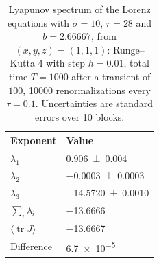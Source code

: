 \begin{table}
\centering
{}
\caption{Lyapunov spectrum of the Lorenz equations with $\sigma = 10$, $r = 28$ and $b = 2.66667$, from $(x, y, z) = (1, 1, 1)$: Runge--Kutta 4 with step $h = 0.01$, total time $T = 1000$ after a transient of $100$, \num{10000} renormalizations every $\tau = 0.1$. Uncertainties are standard errors over 10 blocks.}
\label{tab:lorenz-equations-lyapunov}
\begin{tabular}{@{}ll@{}}
\toprule
Exponent & Value \\
\midrule
$\lambda_{1}$ & \num{0.906 +- 0.004} \\
$\lambda_{2}$ & \num{-0.0003 +- 0.0003} \\
$\lambda_{3}$ & \num{-14.5720 +- 0.0010} \\
\midrule
$\sum_i \lambda_i$ & \num{-13.6666} \\
$\langle \operatorname{tr} J \rangle$ & \num{-13.6667} \\
Difference & \num{6.7e-5} \\
\bottomrule
\end{tabular}
\end{table}
